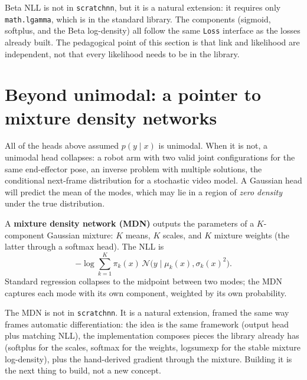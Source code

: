 Beta NLL is not in \texttt{scratchnn}, but it is a natural extension:
it requires only \texttt{math.lgamma}, which is in the standard library.
The components (sigmoid, softplus, and the Beta log-density) all follow
the same \texttt{Loss} interface as the losses already built. The
pedagogical point of this section is that link and likelihood are
independent, not that every likelihood needs to be in the library.

\section{Beyond unimodal: a pointer to mixture density networks}\label{sec:mdn}

All of the heads above assumed $p(y \mid x)$ is unimodal. When it is
not, a unimodal head collapses: a robot arm with two valid joint
configurations for the same end-effector pose, an inverse problem with
multiple solutions, the conditional next-frame distribution for a
stochastic video model. A Gaussian head will predict the mean of the
modes, which may lie in a region of \emph{zero density} under the true
distribution.

A \textbf{mixture density network (MDN)} outputs the parameters of a
$K$-component Gaussian mixture: $K$ means, $K$ scales, and $K$ mixture
weights (the latter through a softmax head). The NLL is
\[
  -\log \sum_{k=1}^{K} \pi_k(x)\,\mathcal{N}\!\bigl(y \mid \mu_k(x), \sigma_k(x)^2\bigr).
\]
Standard regression collapses to the midpoint between two modes; the
MDN captures each mode with its own component, weighted by its own
probability.

The MDN is not in \texttt{scratchnn}. It is a natural extension, framed
the same way  frames automatic differentiation:
the idea is the same framework (output head plus matching NLL), the
implementation composes pieces the library already has (softplus for the
scales, softmax for the weights, logsumexp for the stable mixture
log-density), plus the hand-derived gradient through the mixture.
Building it is the next thing to build, not a new concept.
